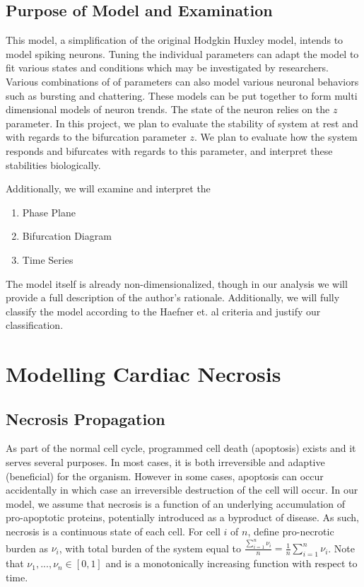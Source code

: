 \documentclass[11pt]{article}
\begin{document}
\subsection{Purpose of Model and Examination}

This model, a simplification of the original Hodgkin Huxley model, intends to model spiking neurons. Tuning the individual parameters can adapt the model to fit various states and conditions which may be investigated by researchers. Various combinations of of parameters can also model various neuronal behaviors such as bursting and chattering. These models can be put together to form multi dimensional models of neuron trends. The state of the neuron relies on the $z$ parameter. 
In this project, we plan to evaluate the stability of system at rest and with regards to the bifurcation parameter $z$. We plan to evaluate how the system responds and bifurcates with regards to this parameter, and interpret these stabilities biologically. %

Additionally, we will examine and interpret the 

\begin{enumerate}
	\item Phase Plane
	\item Bifurcation Diagram
	\item Time Series
\end{enumerate}

The model itself is already non-dimensionalized, though in our analysis we will provide a full description of the author's rationale. Additionally, we will fully classify the model according to the Haefner et. al criteria and justify our classification.


\section{Modelling Cardiac Necrosis} 
\subsection{Necrosis Propagation}

As part of the normal cell cycle, programmed cell death (apoptosis) exists and it serves several purposes. In most cases, it is both irreversible and adaptive (beneficial) for the organism. However in some cases, apoptosis can occur accidentally in which case an irreversible destruction of the cell will occur. In our model, we assume that necrosis is a function of an underlying accumulation of pro-apoptotic proteins, potentially introduced as a byproduct of disease. As such, necrosis is a continuous state of each cell. For cell $i$ of $n$, define pro-necrotic burden as $\nu_i$, with total burden of the system equal to $\frac{\sum^n_{i=1} \nu_i}{n}=\frac{1}{n} \sum^n_{i=1} \nu_i$. Note that $\nu_{1}, ..., \nu_{n} \in [0,1]$ and is a monotonically increasing function with respect to time. 
\end{document}
